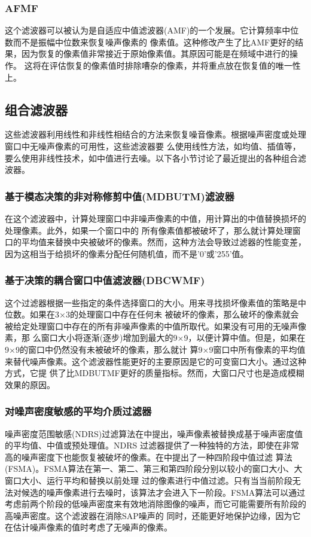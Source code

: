 \documentclass[12pt]{article} %
\begin{document}
\subsubsection{AFMF}
这个\cite{ref9}滤波器可以被认为是自适应中值滤波器(AMF)的一个发展。它计算频率中位数而不是振幅中位数来恢复噪声像素的
像素值。这种修改产生了比AMF更好的结果，因为恢复的像素值非常接近于原始像素值。其原因可能是在频域中进行的操作。
这将在评估恢复的像素值时排除嘈杂的像素，并将重点放在恢复值的唯一性上。

\subsection{组合滤波器}
这些滤波器利用线性和非线性相结合的方法来恢复噪音像素。根据噪声密度或处理窗口中无噪声像素的可用性，这些滤波器要
么使用线性方法，如均值、插值等，要么使用非线性技术，如中值进行去噪。以下各小节讨论了最近提出的各种组合滤波器。

\subsubsection{基于模态决策的非对称修剪中值(MDBUTM)滤波器}
在这个滤波器中，计算处理窗口中非噪声像素的中值，用计算出的中值替换损坏的处理像素\cite{ref11}。此外，如果一个窗口中的
所有像素值都被破坏了，那么就计算处理窗口的平均值来替换中央被破坏的像素。然而，这种方法会导致过滤器的性能变差，
因为这相当于给损坏的像素分配任何随机值，而不是'0'或'255'值。

\subsubsection{基于决策的耦合窗口中值滤波器(DBCWMF)}
这个过滤器根据一些指定的条件选择窗口的大小。用来寻找损坏像素值的策略是中位数。如果在3×3的处理窗口中存在任何未
被破坏的像素，那么破坏的像素就会被给定处理窗口中存在的所有非噪声像素的中值所取代。如果没有可用的无噪声像素，那
么窗口大小将逐渐(逐步)增加到最大的9×9，以便计算中值。但是，如果在9×9的窗口中仍然没有未被破坏的像素，那么就计
算9×9窗口中所有像素的平均值来替代噪声像素。这个滤波器性能更好的主要原因是它的可变窗口大小。通过这种方式，它提
供了比MDBUTMF\cite{ref11}更好的质量指标。然而，大窗口尺寸也是造成模糊效果的原因。

\subsubsection{对噪声密度敏感的平均介质过滤器}
噪声密度范围敏感(NDRS)过滤算法在\cite{ref25}中提出，噪声像素被替换成基于噪声密度值的平均值、中值或预处理值。NDRS
过滤器提供了一种独特的方法，即使在非常高的噪声密度下也能恢复被破坏的像素。在\cite{ref15}中提出了一种四阶段中值过滤
算法(FSMA)。FSMA算法在第一、第二、第三和第四阶段分别以较小的窗口大小、大窗口大小、运行平均和替换以前处理
过的像素进行中值过滤。只有当当前阶段无法对候选的噪声像素进行去噪时，该算法才会进入下一阶段。FSMA算法可以通过
考虑前两个阶段的低噪声密度来有效地消除图像的噪声，而它可能需要所有阶段的高噪声密度。这个滤波器在消除SAP噪声的
同时，还能更好地保护边缘，因为它在估计噪声像素的值时考虑了无噪声的像素。
\end{document}
